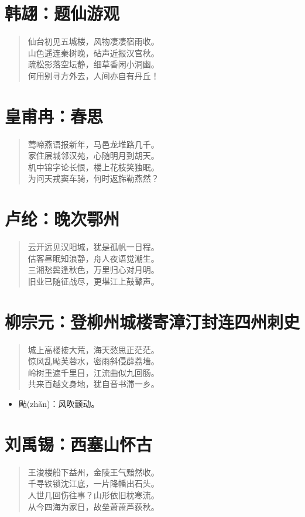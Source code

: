 \documentclass[12pt,oneside]{book}
\newenvironment{shici}{%
\begin{verse}\centering\yanti\large\hspace{12pt}}{\end{verse}}
\begin{document}
\begin{common-format}
\chapter{韩翃：题仙游观}
\begin{shici}
仙台初见五城楼，风物凄凄宿雨收。\\
山色遥连秦树晚，砧声近报汉宫秋。\\
疏松影落空坛静，细草香闲小洞幽。\\
何用别寻方外去，人间亦自有丹丘！
\end{shici}

\chapter{皇甫冉：春思}
\begin{shici}
莺啼燕语报新年，马邑龙堆路几千。\\
家住层城邻汉苑，心随明月到胡天。\\
机中锦字论长恨，楼上花枝笑独眠。\\
为问天戎窦车骑，何时返旆勒燕然？
\end{shici}

\chapter{卢纶：晚次鄂州}
\begin{shici}
云开远见汉阳城，犹是孤帆一日程。\\
估客昼眠知浪静，舟人夜语觉潮生。\\
三湘愁鬓逢秋色，万里归心对月明。\\
旧业已随征战尽，更堪江上鼓鼙声。
\end{shici}

\chapter{柳宗元：登柳州城楼寄漳汀封连四州刺史}
\begin{shici}
城上高楼接大荒，海天愁思正茫茫。\\
惊风乱飐芙蓉水，密雨斜侵薜荔墙。\\
岭树重遮千里目，江流曲似九回肠。\\
共来百越文身地，犹自音书滞一乡。
\end{shici}

\begin{itemize}
\item 飐(zhǎn)：风吹颤动。
\end{itemize}

\chapter{刘禹锡：西塞山怀古}
\begin{shici}
王浚楼船下益州，金陵王气黯然收。\\
千寻铁锁沈江底，一片降幡出石头。\\
人世几回伤往事？山形依旧枕寒流。\\
从今四海为家日，故垒萧萧芦荻秋。
\end{shici}


\end{common-format}
\end{document}
